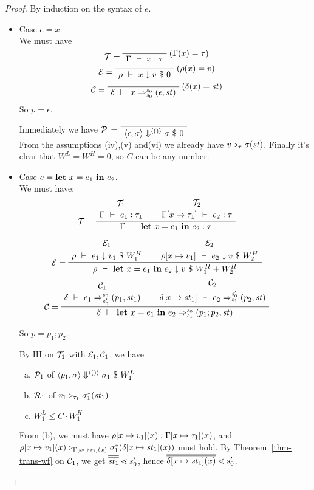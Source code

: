 \begin{proof}
	
	By induction on the syntax of $e$.
	
	\begin{itemize}
	
\item Case $e = x$.\\
We must have 
$$\MT = \PT{
	\AxiomC{}
	\RiLa{(\Gam(x) = \tau)}
	\UC{\Type{\Gam}{x}{\tau}}
}$$
$$ \ME = 
\PT{
	\AxiomC{}
	\RiLa{(\rho(x)=v)}
	\UC{\Eval{\rho}{x}{v}{0}}
}$$
$$ \MC = 
\PT{\AC{}
	\RiLa{(\del(x)= \st)}
	\UC{\Trans{\del}{x}{\s_0}{\s_0}{\sfun{\epsilon}{\st}}}}
$$
So $p= \epsilon$. 

Immediately we have $\mathcal{P}$ =
$\PT{\Axiom{\seval{\epsilon}{\sgm}{\vunit}{\sgm}{0}}}$\\
From the assumptions (iv),(v) and(vi) we already have $v \mathrel{\triangleright_{\tau}} \sigma(\mathit{st})$.
Finally it's clear that $W^L = W^H = 0$, so $C$ can be any number. 


\item \label{case-let} Case $e = \mathbf{let} \ x = e_1 \ \mathbf{in} \ e_2$. \\[1ex]
We must have:
$$\PT{
	\UCN{\MT_1}{\Type{\Gam}{e_1}{\tau_1}}
	\UCN{\MT_2}{\Type{\Gam[\Map{x}{\tau_1}]}{e_2}{\tau}}
	\LeLa{\MT =} 
	\BC{\Type{\Gam}{\Let{x}{e_1}{e_2}}{\tau}}
}$$

$$\PT{	
	\UCN{\ME_1}{\Eval{\rho}{e_1}{v_1}{W^H_1}}
	\UCN{\ME_2}{\Eval{\rho[\Map{x}{v_1}]}{e_2}{v}{W^H_2}}
	\LeLa{\ME =} 
	\BC{\Eval{\rho}{\Let{x}{e_1}{e_2}}{v}{W^H_1+W^H_2}}
}$$ 
$$\PT{\UCN{\MC_1}{\Trans{\del}{e_1}{\s_0}{\s_0'}{\sfun{p_1}{\st_1}}}
	\UCN{\MC_2}{\Trans{\del[x \|-> {\st_1}]}{e_2}{\s_0'}{\s_1}{\sfun {p_2} {\st}}}
	\LeLa{\MC = }
	\BC{\Trans{\del}{\Let{x}{e_1}{e_2}}{\s_0}{\s_1}{\sfun {p_1;p_2} {\st}}}
}$$

So $p = p_1;p_2$. 

By IH on $\mathcal{T}_1$ with $\mathcal{E}_1,\mathcal{C}_1$, we have
\begin{enumerate}[(a)]
	\item $\mathcal{P}_1$ of $\left\langle p_1,\sigma \right\rangle \Downarrow^{\langle () \rangle} \sigma_1 \ \$ \ W^L_1$
	\item $\mathcal{R}_1$ of $v_1 \mathrel{\triangleright_{\tau_1}} \sigma_1^*(\mathit{st}_1)$
    \item $W^L_1 \le C \cdot W^H_1 $ 
\end{enumerate}

From (b), we must have $\rho[x \mapsto v_1](x) : \Gamma[x \mapsto \tau_1](x)$, and  $\rho[x \mapsto v_1](x) \mathrel{\triangleright_{\Gamma[x \mapsto \tau_1](x)}} \sigma_1^*(\delta[x \mapsto \mathit{st}_1](x))$ must hold. 
By Theorem~\ref{thm-trans-wf} on $\mathcal{C}_1$, 
we get $\olol{\st_1} \.< s_0'$, hence $\olol{\delta[\Map{x}{\st_1}](x)} \.< s_0'$. 


\end{itemize}
\end{proof}
